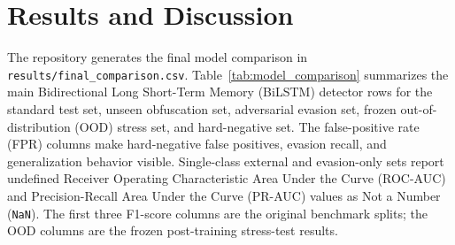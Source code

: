 \documentclass[conference]{IEEEtran}
\begin{document}
\begin{table}[!t]
\caption{Evaluation sets used by the final comparison script.}
\label{tab:evaluation}
\centering
{}
\end{table}

\section{Results and Discussion}

The repository generates the final model comparison in
\texttt{results/final\_comparison.csv}. Table~\ref{tab:model_comparison}
summarizes the main Bidirectional Long Short-Term Memory (BiLSTM) detector
rows for the standard test set, unseen
obfuscation set, adversarial evasion set, frozen out-of-distribution (OOD)
stress set, and hard-negative set. The false-positive rate (FPR) columns make
hard-negative false positives, evasion recall, and generalization behavior
visible. Single-class external and evasion-only sets
report undefined Receiver Operating Characteristic Area Under the Curve
(ROC-AUC) and Precision-Recall Area Under the Curve (PR-AUC) values as
Not a Number (\texttt{NaN}). The first three F1-score columns are the original
benchmark splits; the OOD columns are the frozen post-training stress-test
results.
\end{document}
